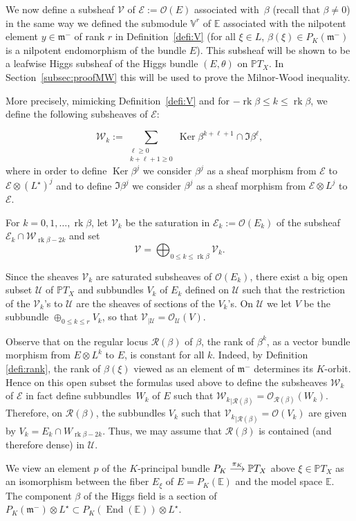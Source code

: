 \documentclass[10pt]{amsart}
\let\mathcal\mathscr
\newcommand{\To}[1]{\mathchoice{\xrightarrow{\textstyle\kern4pt#1\kern3pt}}{\stackrel{#1}{\longrightarrow}}{}{}}
\theoremstyle{plain}
\theoremstyle{definition}
\let\rgy r
\DeclareMathOperator{\End}{End}
\DeclareMathOperator{\Ker}{Ker}
\DeclareMathOperator{\rk}{rk}
\newcommand{\cE}{\mathcal{E}}
\newcommand{\cO}{\mathcal{O}}
\newcommand{\cR}{\mathcal{R}}
\newcommand{\cU}{\mathcal{U}}
\newcommand{\cV}{\mathcal{V}}
\newcommand{\cW}{\mathcal{W}}
\newcommand{\bE}{\mathbb{E}}
\newcommand{\PTX}{{\mathbb{P}T_X}}
\newcommand{\Vr}{\mathbb{V}^\rgy}
\newcommand{\fm}{\mathfrak{m}}
\newcommand{\rgb}{{\rk\beta}}
\begin{document}
We now define a subsheaf
$\cV$ of $\cE:=\cO(E)$ associated with~$\beta$ (\hbox{recall} that $\beta\neq 0$) in the same way we
defined the submodule $\Vr$ of $\bE$ associated with the nilpotent element $y\in\fm^-$ of rank $\rgy$
in Definition~\ref{defi:V} (for all $\xi\in L$, \hbox{$\beta(\xi)\in P_K(\fm^-)$} is a nilpotent endomorphism
of the bundle $E$). This subsheaf will be shown to be a leafwise Higgs subsheaf of the Higgs bundle
$(E,\theta)$ on $\PTX$. In Section~\ref{subsec:proofMW} this will be used to prove the Milnor-Wood
inequality.

More precisely, mimicking Definition~\ref{defi:V} and
for $-\rgb\leq k\leq \rgb$, we define the following subsheaves of $\cE$:

$$
\cW_k:=\sum_{\substack{\ell \geq 0 \\ k+\ell+1 \geq 0}}
\Ker \beta^{k+\ell+1} \cap \Im \beta^\ell,
$$
where in order to define $\Ker \beta^j$ we consider $\beta^j$ as a sheaf morphism from $\cE$
to $\cE\otimes {(L^\star)}^j$ and to define $\Im \beta^j$ we consider $\beta^j$ as a sheaf
morphism from $\cE\otimes L^j$ to $\cE$.

For $k=0,1,\ldots,\rgb$, let $\cV_k$ be the saturation in $\cE_k:=\cO(E_k)$ of the
subsheaf $\cE_k\cap \cW_{\rgb-2k}$ and set $$\cV=\bigoplus_{0\leq k\leq \rgb} \cV_k.$$

Since the sheaves $\cV_k$ are saturated subsheaves of $\cO(E_k)$, there exist a big open
subset $\cU$ of $\PTX$
and subbundles $V_k$ of $ E_k$ defined on $\cU$ such that the
restriction of the $\cV_k$'s to $\cU$ are the sheaves of
sections of the $V_k$'s. On $\cU$
we let $V$ be the subbundle $\oplus_{0\leq k\leq r} V_k$, so that $\cV_{|\cU}={\cO}_{\cU}(V)$.

Observe that on the regular locus
$\cR(\beta)$ of $\beta$, the rank of $\beta^k$, as a vector bundle morphism from $E\otimes
L^k$ to $E$, is constant for all $k$. Indeed, by Definition \ref{defi:rank}, the rank of
$\beta(\xi)$ viewed
as an element of $\fm^-$ determines its $K$-orbit.
Hence on this open subset the formulas used above to define the
subsheaves $\cW_k$ of $\cE$ in fact define subbundles~$W_k$ of $E$ such that ${\cW_k}_{|{\cR}(\beta)}=
\cO_{\cR(\beta)}(W_k)$. Therefore, on $\cR(\beta)$, the
subbundles $V_k$ such that ${\cV_k}_{|{\cR}(\beta)}=\cO(V_k)$ are given by $V_k=E_k\cap W_{\rgb-2k}$.
Thus, we may assume that $\cR(\beta)$ is contained (and therefore dense) in $\cU$.

We view an element $p$ of the $K$-principal bundle $P_K \To{\pi_K}\PTX$ above
$\xi\in\PTX$ as an isomorphism between the fiber $ E_\xi$ of $ E=P_K(\bE)$ and the model space $\bE$.
The component $\beta$ of the Higgs field is a section of $P_K(\fm^-)\otimes L^\star\subset
P_K(\End(\bE))\otimes L^\star$.
\end{document}
